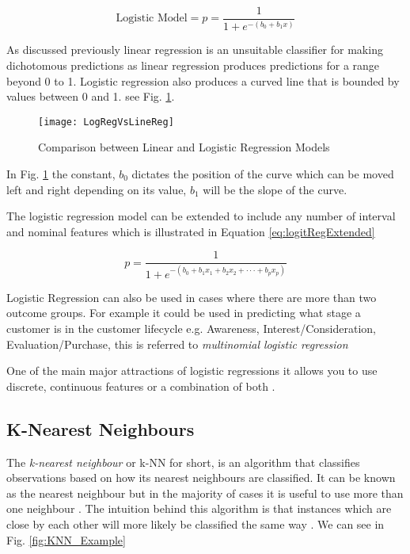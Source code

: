 \begin{equation} \label{eq:logitReg}
	\text{Logistic Model}  =  p  =  \frac{1}{1 + e^{-(b_0 + b_1x)}}
\end{equation}

As discussed previously linear regression is an unsuitable classifier for making dichotomous predictions as linear regression produces predictions for a range beyond 0 to 1. Logistic regression also produces a curved line that is bounded by values between 0 and 1. see Fig. \ref{fig:LogRegVsLineReg}.

\begin{figure}[H]
	\texttt{[image: LogRegVsLineReg]}
	\caption{Comparison between Linear and Logistic Regression Models}
	\label{fig:LogRegVsLineReg}
\end{figure}

In Fig. \ref{fig:LogRegVsLineReg} the constant, $b_0$ dictates the position of the curve which can be moved left and right depending on its value, $b_1$ will be the slope of the curve. 

The logistic regression model can be extended to include any number of interval and nominal features which is illustrated in Equation \ref{eq:logitRegExtended}

\begin{equation} \label{eq:logitRegExtended}
	p  =  \frac{1}{1 + e^{-(b_0 + b_1x_1 + b_2x_2 +\cdot\cdot\cdot+ b_px_p )}}
\end{equation}

Logistic Regression can also be used in cases where there are more than two outcome groups. For example it could be used in predicting what stage a customer is in the customer lifecycle e.g. Awareness, Interest/Consideration, Evaluation/Purchase, this is referred to \textit{multinomial logistic regression}


One of the main major attractions of logistic regressions it allows you to use discrete, continuous features or a combination of both \citep{lee_application_2005}.

\subsection{K-Nearest Neighbours} \label{kNN}
The \textit{k-nearest neighbour} or {k-NN} for short, is an algorithm that classifies observations based on how its nearest neighbours are classified. It can be known as the nearest neighbour but in the majority of cases it is useful to use more than one neighbour \citep{henley_k-nearest-neighbour_1996}. The intuition behind this algorithm is that instances which are close by each other will more likely be classified the same way \citep{cover_nearest_1967}. We can see in Fig. \ref{fig:KNN_Example}\\ %


